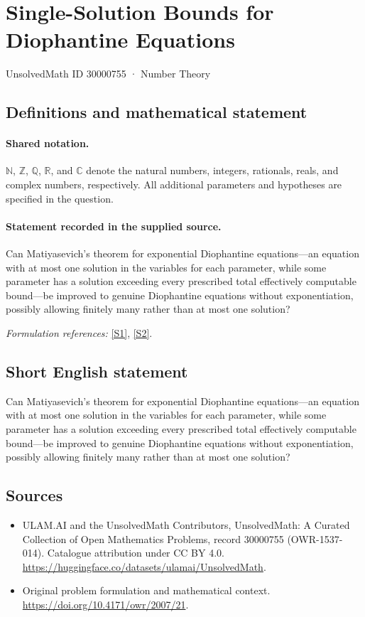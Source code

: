 \documentclass[11pt]{article}
\newcommand{\sref}[2]{\hyperlink{source:#1:#2}{[S#2]}}
\begin{document}
\setcounter{section}{30000754}
\section{Single-Solution Bounds for Diophantine Equations}\label{30000755}
{\small UnsolvedMath ID 30000755 · Number Theory}
\subsection{Definitions and mathematical statement}

\paragraph{Shared notation.}$\mathbb N$, $\mathbb Z$, $\mathbb Q$, $\mathbb R$, and $\mathbb C$ denote the natural numbers, integers, rationals, reals, and complex numbers, respectively. All additional parameters and hypotheses are specified in the question.


\paragraph{Statement recorded in the supplied source.}
Can Matiyasevich’s theorem for exponential Diophantine equations—an equation with at most one solution in the variables for each parameter, while some parameter has a solution exceeding every prescribed total effectively computable bound—be improved to genuine Diophantine equations without exponentiation, possibly allowing finitely many rather than at most one solution?
\par\smallskip\textit{Formulation references:} \sref{30000755}{1}, \sref{30000755}{2}.
\subsection{Short English statement}
Can Matiyasevich’s theorem for exponential Diophantine equations—an equation with at most one solution in the variables for each parameter, while some parameter has a solution exceeding every prescribed total effectively computable bound—be improved to genuine Diophantine equations without exponentiation, possibly allowing finitely many rather than at most one solution?
\subsection{Sources}
\begin{itemize}
\item[\hypertarget{source:30000755:1}{S1}] ULAM.AI and the UnsolvedMath Contributors, UnsolvedMath: A Curated Collection of Open Mathematics Problems, record 30000755 (OWR-1537-014). Catalogue attribution under CC BY 4.0.
\url{https://huggingface.co/datasets/ulamai/UnsolvedMath}.
\item[\hypertarget{source:30000755:2}{S2}] Original problem formulation and mathematical context.
\url{https://doi.org/10.4171/owr/2007/21}.
\end{itemize}
\label{end:30000755}
\end{document}
